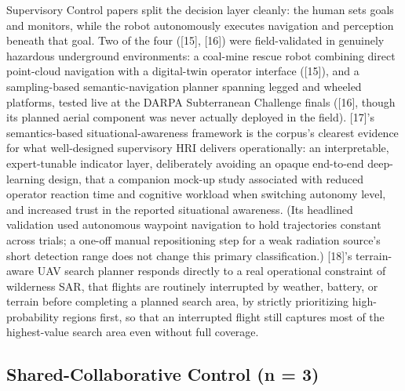 \documentclass[journal]{IEEEtran}
\begin{document}
Supervisory Control papers split the decision layer cleanly: the human sets goals and monitors, while the robot autonomously executes navigation and perception beneath that goal. Two of the four ([15], [16]) were field-validated in genuinely hazardous underground environments: a coal-mine rescue robot combining direct point-cloud navigation with a digital-twin operator interface ([15]), and a sampling-based semantic-navigation planner spanning legged and wheeled platforms, tested live at the DARPA Subterranean Challenge finals ([16], though its planned aerial component was never actually deployed in the field). [17]'s semantics-based situational-awareness framework is the corpus's clearest evidence for what well-designed supervisory HRI delivers operationally: an interpretable, expert-tunable indicator layer, deliberately avoiding an opaque end-to-end deep-learning design, that a companion mock-up study associated with reduced operator reaction time and cognitive workload when switching autonomy level, and increased trust in the reported situational awareness. (Its headlined validation used autonomous waypoint navigation to hold trajectories constant across trials; a one-off manual repositioning step for a weak radiation source's short detection range does not change this primary classification.) [18]'s terrain-aware UAV search planner responds directly to a real operational constraint of wilderness SAR, that flights are routinely interrupted by weather, battery, or terrain before completing a planned search area, by strictly prioritizing high-probability regions first, so that an interrupted flight still captures most of the highest-value search area even without full coverage.

\subsection{Shared-Collaborative Control (n = 3)}
\end{document}
